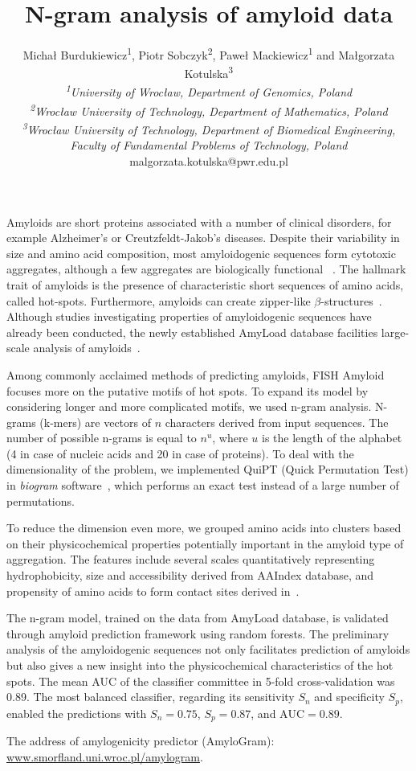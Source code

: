 \documentclass[english]{gcb15abstract}
\title{N-gram analysis of amyloid data}
\author{
Micha\l{} Burdukiewicz\textsuperscript{1}, Piotr Sobczyk\textsuperscript{2}, Pawe\l{} Mackiewicz\textsuperscript{1} and Ma\l{}gorzata Kotulska\textsuperscript{3} \\
\small{
{\normalfont\itshape \textsuperscript{1}University of Wroc\l{}aw, Department of Genomics, Poland}\\
{\normalfont\itshape \textsuperscript{2}Wroc\l{}aw University of Technology, Department of Mathematics, Poland}\\
{\normalfont\itshape \textsuperscript{3}Wroc\l{}aw University of Technology, Department of Biomedical Engineering, Faculty of Fundamental Problems of Technology, Poland}\\
malgorzata.kotulska@pwr.edu.pl
}
}
\begin{document}
\maketitle 

Amyloids are short proteins associated with a number of clinical disorders, for example Alzheimer's or Creutzfeldt-Jakob's diseases. Despite their variability in size and amino acid composition, most amyloidogenic sequences form cytotoxic aggregates, although a few aggregates are biologically functional ~\cite{breydo_structural_2015}. The hallmark trait of amyloids is the presence of characteristic short sequences of amino acids, called hot-spots. Furthermore, amyloids can create zipper\mbox{-}\nobreak\hspace{0pt}like $\beta$\mbox{-}\nobreak\hspace{0pt}structures~\cite{fandrich_oligomeric_2012}. Although studies investigating properties of amyloidogenic sequences have already been conducted, the newly established AmyLoad database facilities large-scale analysis of amyloids~\cite{wozniak_amyload:_2015}.

Among commonly acclaimed methods of predicting amyloids, FISH Amyloid~\cite{gasior_fish_2014} focuses more on the putative motifs of hot spots. To expand its model by considering longer and more complicated motifs, we used n-gram analysis. N-grams (k-mers) are vectors of $n$ characters derived from input sequences. The number of possible n-grams is equal to $n^u$, where $u$ is the length of the alphabet (4 in case of nucleic acids and 20 in case of proteins). To deal with the dimensionality of the problem, we implemented QuiPT (Quick Permutation Test) in \textit{biogram} software~\cite{burdukiewicz_biogram:_2015}, which performs an exact test instead of a large number of permutations. 

To reduce the dimension even more, we grouped amino acids into clusters based on their physicochemical properties potentially important in the amyloid type of aggregation. The features include several scales quantitatively representing hydrophobicity, size and accessibility derived from AAIndex database, and propensity of amino acids to form contact sites derived in~\cite{wozniak_characteristics_2014}.

The n-gram model, trained on the data from AmyLoad database, is validated through amyloid prediction framework using random forests. The preliminary analysis of the amyloidogenic sequences not only facilitates prediction of amyloids but also gives a new insight into the physicochemical characteristics of the hot spots. The mean AUC of the classifier committee in 5-fold cross-validation was 0.89. The most balanced classifier, regarding its sensitivity $S_n$ and specificity $S_p$, enabled the predictions with $S_n=0.75$, $S_p=0.87$, and $\textrm{AUC}=0.89$. 

The address of amylogenicity predictor (AmyloGram):  
\url{www.smorfland.uni.wroc.pl/amylogram}.

\scriptsize{

}
\end{document}
